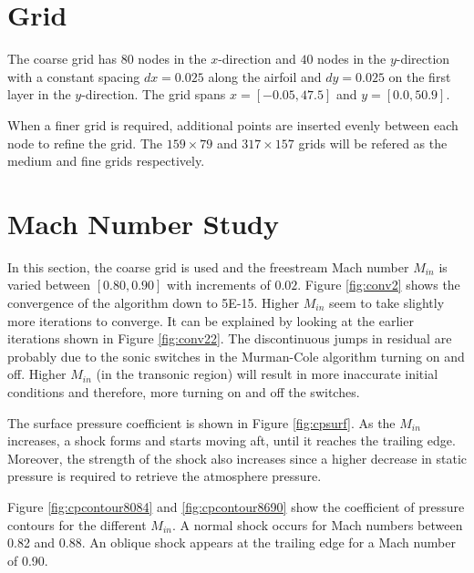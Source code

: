 \documentclass[letterpaper,12pt,]{article}
\begin{document}



\section*{Grid}

The coarse grid has $80$ nodes in the $x$-direction and $40$ nodes in the $y$-direction with a constant spacing $dx = 0.025$ along the airfoil and $dy=0.025$ on the first layer in the $y$-direction.
The grid spans $x=[-0.05, 47.5]$ and $y=[0.0, 50.9]$.

When a finer grid is required, additional points are inserted evenly between each node to refine the grid.
The $159 \times 79$ and $317 \times 157$ grids will be refered as the medium and fine grids respectively.

\section*{Mach Number Study}

In this section, the coarse grid is used and the freestream Mach number $M_{in}$ is varied between $[0.80,0.90]$ with increments of $0.02$.
Figure \ref{fig:conv2} shows the convergence of the algorithm down to 5\textsc{E-}15.
Higher $M_{in}$ seem to take slightly more iterations to converge.
It can be explained by looking at the earlier iterations shown in Figure \ref{fig:conv22}.
The discontinuous jumps in residual are probably due to the sonic switches in the Murman-Cole algorithm turning on and off.
Higher $M_{in}$ (in the transonic region) will result in more inaccurate initial conditions and therefore, more turning on and off the switches.

The surface pressure coefficient is shown in Figure \ref{fig:cpsurf}.
As the $M_{in}$ increases, a shock forms and starts moving aft, until it reaches the trailing edge.
Moreover, the strength of the shock also increases since a higher decrease in static pressure is required to retrieve the atmosphere pressure.

Figure \ref{fig:cpcontour8084} and \ref{fig:cpcontour8690} show the coefficient of pressure contours for the different $M_{in}$.
A normal shock occurs for Mach numbers between 0.82 and 0.88.
An oblique shock appears at the trailing edge for a Mach number of 0.90.
\end{document}
